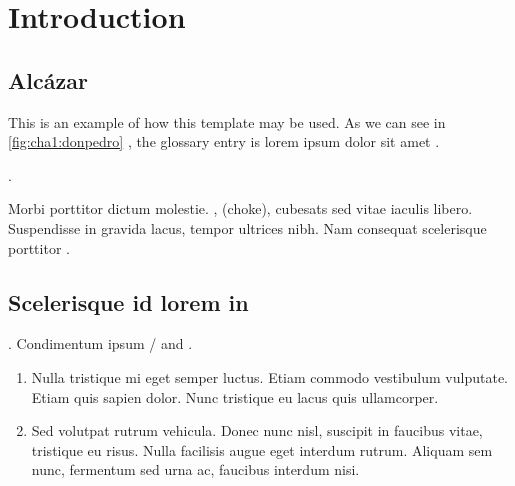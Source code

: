 % 
% 
% 



\clearpage
\cleardoublepage

\chapter{Introduction}

\section{Alcázar}

This is an example of how this template may be used. As we can see in \autoref{fig:cha1:donpedro} \cite{cubesat-impact-astronomy, lora-phy-understanding}, the glossary entry  is lorem ipsum dolor sit amet  \cite{nasa-soa2023-avionics, book-product-devel, maral-satcoms, solder-defects}.

\lipsum[12] \cite{cubesat-impact-astronomy}.

Morbi porttitor dictum molestie. , (\glsdesc{choke}), \glspl{cubesat} sed vitae iaculis libero. Suspendisse in gravida lacus, tempor ultrices nibh. Nam consequat scelerisque porttitor \cite{solder-defects}.

\section{Scelerisque id lorem in}

\lipsum[13]. Condimentum ipsum / and  \cite{grounding-schemes-sats}. 

\begin{enumerate}
    \item Nulla tristique mi eget semper luctus. Etiam commodo vestibulum vulputate. Etiam quis sapien dolor. Nunc tristique eu lacus quis ullamcorper. 
    \item Sed volutpat rutrum vehicula. Donec nunc nisl, suscipit in faucibus vitae, tristique eu risus. Nulla facilisis augue eget interdum rutrum. Aliquam sem nunc, fermentum sed urna ac, faucibus interdum nisi.
\end{enumerate}

